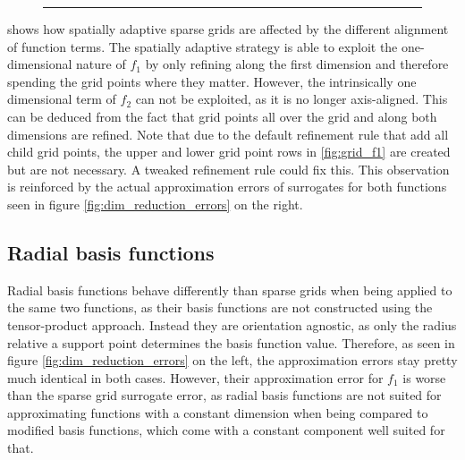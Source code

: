 \documentclass[
  a4paper,  %
  twoside,  %
  bibliography=totoc,
  headsepline,
  cleardoublepage=empty,
  parskip=half,
  draft=false
]{scrbook}
\newcommand{\delimit}{{\color{charcoal}\noindent\rule{\textwidth}{1pt}}}
\begin{document}
\begin{mdframed}[style=style]
\begin{figure}[H]
\begin{subfigure}{.5\textwidth}
  \label{fig:grid_f2}
\end{subfigure}
\vspace{2.5mm}
\delimit
{}
\label{fig:grids}
\end{figure}
\end{mdframed}

 shows how spatially adaptive sparse grids are affected by the different alignment of function terms.
The spatially adaptive strategy is able to exploit the one-dimensional nature of $f_1$ by only refining along the first dimension and therefore spending the grid points where they matter.
However, the intrinsically one dimensional term of $f_2$ can not be exploited, as it is no longer axis-aligned.
This can be deduced from the fact that grid points all over the grid and along both dimensions are refined.
Note that due to the default refinement rule that add all child grid points, the upper and lower grid point rows in \cref{fig:grid_f1} are created but are not necessary.
A tweaked refinement rule could fix this.
This observation is reinforced by the actual approximation errors of surrogates for both functions seen in figure \cref{fig:dim_reduction_errors} on the right.

\subsection{Radial basis functions}

Radial basis functions behave differently than sparse grids when being applied to the same two functions, as their basis functions are not constructed using the tensor-product approach.
Instead they are orientation agnostic, as only the radius relative a support point determines the basis function value.
Therefore, as seen in figure \cref{fig:dim_reduction_errors} on the left, the approximation errors stay pretty much identical in both cases.
However, their approximation error for $f_1$ is worse than the sparse grid surrogate error, as radial basis functions are not suited for approximating functions with a constant dimension when being compared to modified basis functions, which come with a constant component well suited for that.
\end{document}
